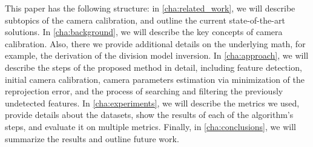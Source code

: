 This paper has the following structure: in \cref{cha:related_work}, we will describe
subtopics of the camera calibration, and outline the current state-of-the-art solutions.
In \cref{cha:background}, we will describe the key concepts of camera
calibration. Also, there we provide additional details on the underlying math,
for example, the derivation of the division model inversion. In
\cref{cha:approach}, we will describe the steps of the proposed method in
detail, including feature detection, initial camera calibration, camera
parameters estimation via minimization of the reprojection error, and the
process of searching and filtering the previously undetected features. In
\cref{cha:experiments}, we will describe the metrics we used, provide details about
the datasets, show the results of each of the algorithm's steps, and evaluate it
on multiple metrics. Finally, in \cref{cha:conclusions}, we will summarize the
results and outline future work.


